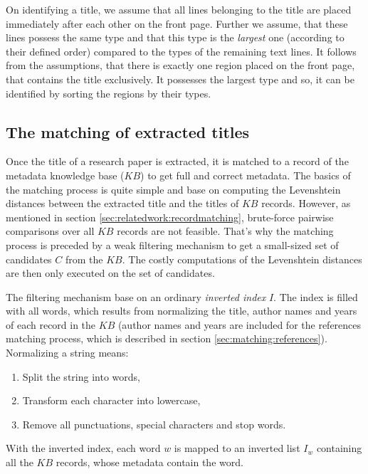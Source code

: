 On identifying a title, we assume that all lines belonging to the title are placed immediately after each other on the front page. Further we assume, that these lines possess the same type and that this type is the \textit{largest}  one (according to their defined order) compared to the types of the remaining text lines. It follows from the assumptions, that there is exactly one region placed on the front page, that contains the title exclusively. It possesses the largest type and so, it can be identified by sorting the regions by their types.

\subsection{The matching of extracted titles}\label{sec:trmatching}

Once the title of a research paper is extracted, it is matched to a record of the metadata knowledge base ($KB$) to get full and correct metadata. The basics of the matching process is quite simple and base on computing the Levenshtein distances between the extracted title and the titles of $KB$ records.
However, as mentioned in section \ref{sec:relatedwork:recordmatching}, brute-force pairwise comparisons over all $KB$ records are not feasible. That's why the matching process is preceded by a weak filtering mechanism to get a small-sized set of candidates $C$ from the $KB$. The costly computations of the Levenshtein distances are then only executed on the set of candidates.
   
The filtering mechanism base on an ordinary \textit{inverted index} $I$. The index is filled with all words, which results from normalizing the title, author names and years of each record in the $KB$ (author names and years are included for the references matching process, which is described in section \ref{sec:matching:references}). Normalizing a string means:
\begin{enumerate}
\renewcommand{\labelenumi}{(\arabic{enumi})}
\setlength{\itemsep}{-1pt} 
\item Split the string into words, 
\item Transform each character into lowercase,
\item Remove all punctuations, special characters and stop words. 
\end{enumerate}
With the inverted index, each word $w$ is mapped to an inverted list $I_w$ containing all the $KB$ records, whose metadata contain the word.
 
